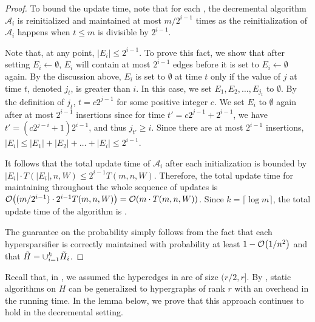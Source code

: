 \begin{proof}
To bound the update time, note that for each , the decremental algorithm \( \mathcal A_i \) is reinitialized and maintained at most \( m / 2^{i - 1} \) times as the reinitialization of \( \mathcal A_i \) happens when \( t \leq m \) is divisible by \( 2^{i - 1} \).

Note that, at any point, \( |E_i| \leq 2^{i - 1} \).
To prove this fact, we show that after setting \( E_i \gets \emptyset \), \( E_i \) will contain at most \( 2^{i - 1} \) edges before it is set to \( E_i \gets \emptyset \) again.
By the discussion above, \( E_i \) is set to \( \emptyset \) at time \( t \) only if the value of \( j \) at time \( t \), denoted \( j_t \), is greater than \( i \).
In this case, we set \( E_1, E_2, \dots, E_{j_t} \) to \( \emptyset \).
By the definition of \( j_t \), \( t = c 2^{j - 1} \) for some positive integer \( c \).
We set \( E_i \) to  \( \emptyset \) again after at most \( 2^{i - 1} \) insertions since for time \( t' = c 2^{j - 1} + 2^{i - 1} \), we have \( t' = \left( c 2^{j - i} + 1 \right) 2^{i - 1} \), and thus \( j_{t'} \geq i \).
Since there are at most \( 2^{i - 1} \) insertions, \( |E_i| \leq |E_1| + |E_2| + \dots + |E_i| \leq 2^{i - 1} \).


It follows that the total update time of \( \mathcal A_i \) after each initialization is bounded by \( |E_i| \cdot T(|E_i|, n, W) \leq 2^{i - 1} T(m, n, W) \).
Therefore, the total update time for maintaining  throughout the whole sequence of updates is \( \atmost{(m / 2^{i - 1}) \cdot 2^{i - 1} T(m, n, W)}  = \atmost{m \cdot T(m, n, W)} \).
Since \( k = \lceil \log m \rceil \), the total update time of the algorithm is .

The guarantee on the probability simply follows from the fact that each hypersparsifier  is correctly maintained with probability at least \( 1 - \atmost{1/n^2} \) and that \( { \tilde H} = \cup_{i = 1} ^k { \tilde H_i} \).
\end{proof}









Recall that, in , we assumed the hyperedges in  are of size \( (r/2, r ] \).
By , static algorithms on \( H \) can be generalized to hypergraphs of rank \( r \) with an  overhead in the running time.
In the lemma below, we prove that this approach continues to hold in the decremental setting. 


